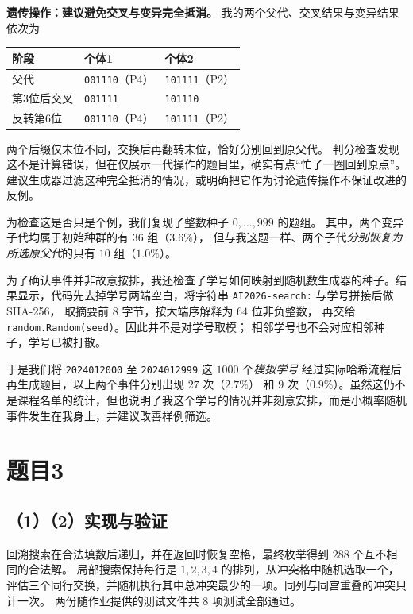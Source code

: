 \documentclass[utf8]{ctexart}
\theoremstyle{mystyle}
\begin{document}
\clearpage
\noindent\textbf{遗传操作：建议避免交叉与变异完全抵消。}
我的两个父代、交叉结果与变异结果依次为
\begin{center}
\begin{tabular}{lll}
\toprule
阶段 & 个体1 & 个体2\\
\midrule
父代 & \texttt{001110}（P4） & \texttt{101111}（P2）\\
第3位后交叉 & \texttt{001111} & \texttt{101110}\\
反转第6位 & \texttt{001110}（P4） & \texttt{101111}（P2）\\
\bottomrule
\end{tabular}
\end{center}
两个后缀仅末位不同，交换后再翻转末位，恰好分别回到原父代。
判分检查发现这不是计算错误，但在仅展示一代操作的题目里，确实有点“忙了一圈回到原点”。
建议生成器过滤这种完全抵消的情况，或明确把它作为讨论遗传操作不保证改进的反例。

为检查这是否只是个例，我们复现了整数种子 $0,\ldots,999$ 的题组。
其中，两个变异子代均属于初始种群的有 $36$ 组（$3.6\%$），
但与我这题一样、两个子代\emph{分别恢复为所选原父代}的只有 $10$ 组（$1.0\%$）。

为了确认事件并非故意按排，我还检查了学号如何映射到随机数生成器的种子。结果显示，代码先去掉学号两端空白，将字符串
\texttt{AI2026-search:} 与学号拼接后做 SHA-256，
取摘要前 $8$ 字节，按大端序解释为 $64$ 位非负整数，
再交给 \texttt{random.Random(seed)}。因此并不是对学号取模；
相邻学号也不会对应相邻种子，学号已被打散。

于是我们将
\texttt{2024012000} 至 \texttt{2024012999} 这 $1000$ 个\emph{模拟学号}
经过实际哈希流程后再生成题目，以上两个事件分别出现 $27$ 次（$2.7\%$）
和 $9$ 次（$0.9\%$）。虽然这仍不是课程名单的统计，但也说明了我这个学号的情况并非刻意安排，而是小概率随机事件发生在我身上，并建议改善样例筛选。


\clearpage
\section*{题目3}
\subsection*{（1）（2）实现与验证}
回溯搜索在合法填数后递归，并在返回时恢复空格，最终枚举得到 $288$ 个互不相同的合法解。
局部搜索保持每行是 $1,2,3,4$ 的排列，从冲突格中随机选取一个，
评估三个同行交换，并随机执行其中总冲突最少的一项。同列与同宫重叠的冲突只计一次。
两份随作业提供的测试文件共 $8$ 项测试全部通过。
\end{document}
